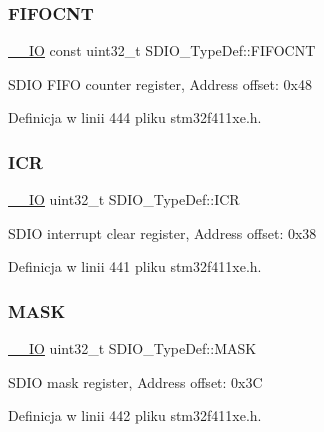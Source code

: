 \subsubsection{\texorpdfstring{F\+I\+F\+O\+C\+NT}{FIFOCNT}}
{\footnotesize\ttfamily \hyperlink{core__sc300_8h_aec43007d9998a0a0e01faede4133d6be}{\+\_\+\+\_\+\+IO} const uint32\+\_\+t S\+D\+I\+O\+\_\+\+Type\+Def\+::\+F\+I\+F\+O\+C\+NT}

S\+D\+IO F\+I\+FO counter register, Address offset\+: 0x48 

Definicja w linii 444 pliku stm32f411xe.\+h.

\mbox{\label{struct_s_d_i_o___type_def_ae3c052b85cc438d2b3069f99620e5139}} 
\subsubsection{\texorpdfstring{I\+CR}{ICR}}
{\footnotesize\ttfamily \hyperlink{core__sc300_8h_aec43007d9998a0a0e01faede4133d6be}{\+\_\+\+\_\+\+IO} uint32\+\_\+t S\+D\+I\+O\+\_\+\+Type\+Def\+::\+I\+CR}

S\+D\+IO interrupt clear register, Address offset\+: 0x38 

Definicja w linii 441 pliku stm32f411xe.\+h.

\mbox{\label{struct_s_d_i_o___type_def_a9a08e405ab985c60ff9031025ab37d31}} 
\subsubsection{\texorpdfstring{M\+A\+SK}{MASK}}
{\footnotesize\ttfamily \hyperlink{core__sc300_8h_aec43007d9998a0a0e01faede4133d6be}{\+\_\+\+\_\+\+IO} uint32\+\_\+t S\+D\+I\+O\+\_\+\+Type\+Def\+::\+M\+A\+SK}

S\+D\+IO mask register, Address offset\+: 0x3C 

Definicja w linii 442 pliku stm32f411xe.\+h.

\mbox{\label{struct_s_d_i_o___type_def_a7c156bc55f6d970a846a459d57a9e940}} 
